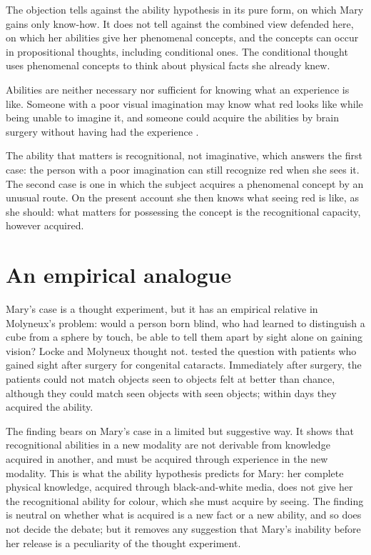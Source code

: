 \documentclass{situationist-preprint}
\begin{document}
\begin{reply}
The objection tells against the ability hypothesis in its pure form, on which Mary gains only know-how. It does not tell against the combined view defended here, on which her abilities give her phenomenal concepts, and the concepts can occur in propositional thoughts, including conditional ones. The conditional thought uses phenomenal concepts to think about physical facts she already knew.
\end{reply}

\begin{objection}
Abilities are neither necessary nor sufficient for knowing what an experience is like. Someone with a poor visual imagination may know what red looks like while being unable to imagine it, and someone could acquire the abilities by brain surgery without having had the experience \citep{Alter1998}.
\end{objection}

\begin{reply}
The ability that matters is recognitional, not imaginative, which answers the first case: the person with a poor imagination can still recognize red when she sees it. The second case is one in which the subject acquires a phenomenal concept by an unusual route. On the present account she then knows what seeing red is like, as she should: what matters for possessing the concept is the recognitional capacity, however acquired.
\end{reply}

\section{An empirical analogue}

Mary's case is a thought experiment, but it has an empirical relative in Molyneux's problem: would a person born blind, who had learned to distinguish a cube from a sphere by touch, be able to tell them apart by sight alone on gaining vision? Locke and Molyneux thought not. \citet{Held2011} tested the question with patients who gained sight after surgery for congenital cataracts. Immediately after surgery, the patients could not match objects seen to objects felt at better than chance, although they could match seen objects with seen objects; within days they acquired the ability.

The finding bears on Mary's case in a limited but suggestive way. It shows that recognitional abilities in a new modality are not derivable from knowledge acquired in another, and must be acquired through experience in the new modality. This is what the ability hypothesis predicts for Mary: her complete physical knowledge, acquired through black-and-white media, does not give her the recognitional ability for colour, which she must acquire by seeing. The finding is neutral on whether what is acquired is a new fact or a new ability, and so does not decide the debate; but it removes any suggestion that Mary's inability before her release is a peculiarity of the thought experiment.
\end{document}
